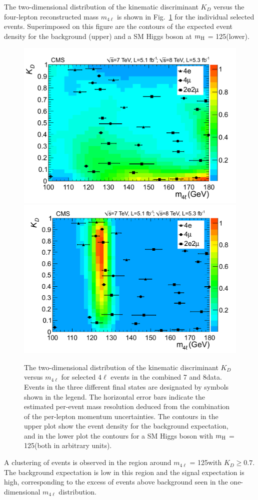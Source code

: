 \documentclass[12pt,twoside,a4paper,cmspaper,final,collab]{cms-tdr}
\begin{document}
The two-dimensional distribution of the kinematic discriminant $K_{D}$ versus the four-lepton reconstructed mass
$m_{4\ell}$ is shown in Fig.~\ref{fig:Mass4lKD} for the individual selected events.
Superimposed on this figure are the contours of the
expected event density for the background (upper) and a
SM Higgs boson at $m_{\mathrm{H}}$ = 125\GeV (lower).
\begin{figure}[htbp]
   \begin{center}
     \includegraphics[width=0.7\linewidth]{figures/HZZ_candidates_mela_background}
     \includegraphics[width=0.7\linewidth]{figures/HZZ_candidates_mela_signal}
    \caption{
    The two-dimensional distribution of  the kinematic
    discriminant $K_{D}$ versus $m_{4\ell}$ for selected $4\ell$ events in the combined 7 and 8\TeV data.
    Events in the three different final states are designated by symbols shown in the legend.
    The horizontal error bars indicate the estimated per-event mass resolution deduced from the
    combination of the per-lepton momentum uncertainties.
    The contours in the upper plot show the event density for the background expectation,
    and in the lower plot the contours for a
    SM Higgs boson with $m_{\mathrm{H}}$ = 125\GeV (both in arbitrary units). }
\label{fig:Mass4lKD}
   \end{center}
\end{figure}
A clustering of events is observed in the region around $m_{4\ell}$ = 125\GeV with $K_{D} \ge 0.7$.
The background expectation is low in this region and
the signal expectation is high, corresponding to the excess of events above background seen in the
one-dimensional $m_{4\ell}$ distribution.
\end{document}
